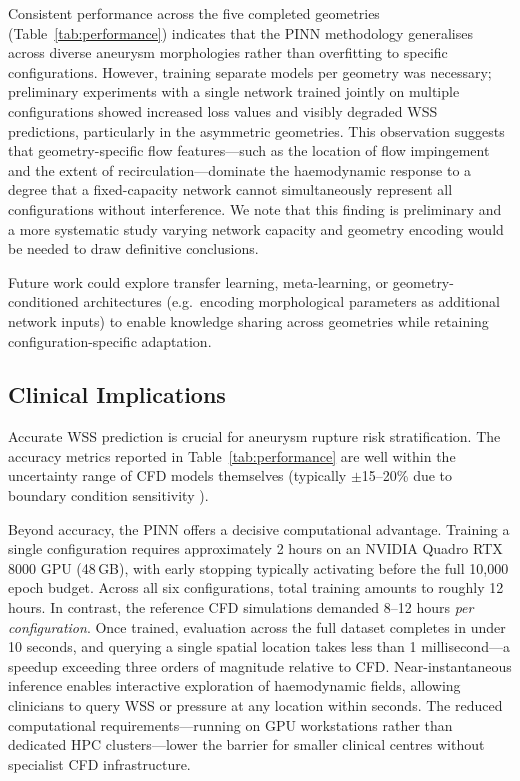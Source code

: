 \documentclass[11pt,a4paper]{article}
\begin{document}
Consistent performance across the five completed geometries (Table~\ref{tab:performance}) indicates that the PINN methodology generalises across diverse aneurysm morphologies rather than overfitting to specific configurations. However, training separate models per geometry was necessary; preliminary experiments with a single network trained jointly on multiple configurations showed increased loss values and visibly degraded WSS predictions, particularly in the asymmetric geometries. This observation suggests that geometry-specific flow features---such as the location of flow impingement and the extent of recirculation---dominate the haemodynamic response to a degree that a fixed-capacity network cannot simultaneously represent all configurations without interference. We note that this finding is preliminary and a more systematic study varying network capacity and geometry encoding would be needed to draw definitive conclusions.

Future work could explore transfer learning, meta-learning, or geometry-conditioned architectures (e.g.\ encoding morphological parameters as additional network inputs) to enable knowledge sharing across geometries while retaining configuration-specific adaptation.

\subsection{Clinical Implications}

Accurate WSS prediction is crucial for aneurysm rupture risk stratification. The accuracy metrics reported in Table~\ref{tab:performance} are well within the uncertainty range of CFD models themselves (typically $\pm$15--20\% due to boundary condition sensitivity \cite{ref19}).

Beyond accuracy, the PINN offers a decisive computational advantage. Training a single configuration requires approximately 2 hours on an NVIDIA Quadro RTX 8000 GPU (48\,GB), with early stopping typically activating before the full 10{,}000 epoch budget. Across all six configurations, total training amounts to roughly 12 hours. In contrast, the reference CFD simulations demanded 8--12 hours \emph{per configuration}. Once trained, evaluation across the full dataset completes in under 10 seconds, and querying a single spatial location takes less than 1 millisecond---a speedup exceeding three orders of magnitude relative to CFD. Near-instantaneous inference enables interactive exploration of haemodynamic fields, allowing clinicians to query WSS or pressure at any location within seconds. The reduced computational requirements---running on GPU workstations rather than dedicated HPC clusters---lower the barrier for smaller clinical centres without specialist CFD infrastructure.
\end{document}
